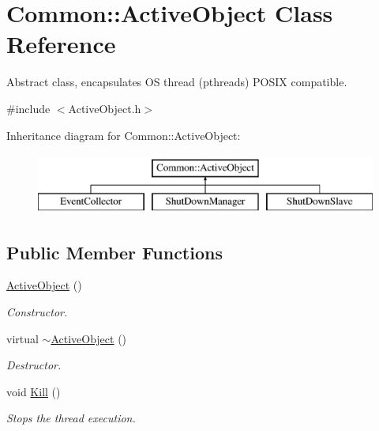 \hypertarget{class_common_1_1_active_object}{\section{Common\-:\-:Active\-Object Class Reference}
\label{class_common_1_1_active_object}
}


Abstract class, encapsulates O\-S thread (pthreads) P\-O\-S\-I\-X compatible.  




{\ttfamily \#include $<$Active\-Object.\-h$>$}

Inheritance diagram for Common\-:\-:Active\-Object\-:\begin{figure}[H]
\begin{center}
\leavevmode
\includegraphics[height=2.000000cm]{class_common_1_1_active_object}
\end{center}
\end{figure}
\subsection*{Public Member Functions}
\begin{DoxyCompactItemize}
\item 
\hypertarget{class_common_1_1_active_object_ab695c61e3f83e29eede97c8c09308fb4}{\hyperlink{class_common_1_1_active_object_ab695c61e3f83e29eede97c8c09308fb4}{Active\-Object} ()}\label{class_common_1_1_active_object_ab695c61e3f83e29eede97c8c09308fb4}

\begin{DoxyCompactList}\small\item\em Constructor. \end{DoxyCompactList}\item 
\hypertarget{class_common_1_1_active_object_a69493bb331c7557aca8d3bd08203b086}{virtual \hyperlink{class_common_1_1_active_object_a69493bb331c7557aca8d3bd08203b086}{$\sim$\-Active\-Object} ()}\label{class_common_1_1_active_object_a69493bb331c7557aca8d3bd08203b086}

\begin{DoxyCompactList}\small\item\em Destructor. \end{DoxyCompactList}\item 
\hypertarget{class_common_1_1_active_object_ad39e4bb7a48b39470cbab48ab8ed11ff}{void \hyperlink{class_common_1_1_active_object_ad39e4bb7a48b39470cbab48ab8ed11ff}{Kill} ()}\label{class_common_1_1_active_object_ad39e4bb7a48b39470cbab48ab8ed11ff}

\begin{DoxyCompactList}\small\item\em Stops the thread execution. \end{DoxyCompactList}\end{DoxyCompactItemize}
